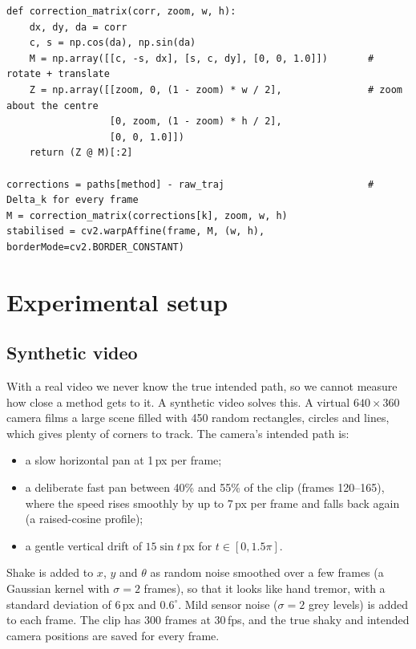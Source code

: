 \documentclass[11pt,a4paper]{article}
\begin{document}
\begin{lstlisting}[caption={Correction warp and border zoom (\texttt{stabilize.py}).},label=lst:warp]
def correction_matrix(corr, zoom, w, h):
    dx, dy, da = corr
    c, s = np.cos(da), np.sin(da)
    M = np.array([[c, -s, dx], [s, c, dy], [0, 0, 1.0]])       # rotate + translate
    Z = np.array([[zoom, 0, (1 - zoom) * w / 2],               # zoom about the centre
                  [0, zoom, (1 - zoom) * h / 2],
                  [0, 0, 1.0]])
    return (Z @ M)[:2]

corrections = paths[method] - raw_traj                         # Delta_k for every frame
M = correction_matrix(corrections[k], zoom, w, h)
stabilised = cv2.warpAffine(frame, M, (w, h), borderMode=cv2.BORDER_CONSTANT)
\end{lstlisting}

\section{Experimental setup}\label{sec:setup}

\subsection{Synthetic video}
With a real video we never know the true intended path, so we cannot measure how close a
method gets to it. A synthetic video solves this. A virtual $640\times360$ camera films a large
scene filled with 450 random rectangles, circles and lines, which gives plenty of corners to
track. The camera's intended path is:
\begin{itemize}
  \item a slow horizontal pan at 1\,px per frame;
  \item a deliberate fast pan between 40\% and 55\% of the clip (frames 120--165), where the
        speed rises smoothly by up to 7\,px per frame and falls back again (a raised-cosine
        profile);
  \item a gentle vertical drift of $15\sin t$\,px for $t \in [0, 1.5\pi]$.
\end{itemize}
Shake is added to $x$, $y$ and $\theta$ as random noise smoothed over a few frames (a Gaussian
kernel with $\sigma = 2$ frames), so that it looks like hand tremor, with a standard deviation
of 6\,px and $0.6^\circ$. Mild sensor noise ($\sigma = 2$ grey levels) is added to each frame.
The clip has 300 frames at 30\,fps, and the true shaky and intended camera positions are saved
for every frame.
\end{document}

